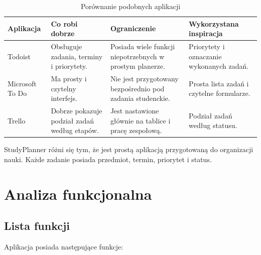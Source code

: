 \documentclass[12pt,a4paper]{article}
\begin{document}
\begin{table}[H]
\centering
\small
\begin{tabularx}{\textwidth}{|p{2.5cm}|X|X|X|}
\hline
\textbf{Aplikacja} &
\textbf{Co robi dobrze} &
\textbf{Ograniczenie} &
\textbf{Wykorzystana inspiracja} \\
\hline

Todoist &
Obsługuje zadania, terminy i priorytety. &
Posiada wiele funkcji niepotrzebnych w prostym planerze. &
Priorytety i oznaczanie wykonanych zadań. \\
\hline

Microsoft To Do &
Ma prosty i czytelny interfejs. &
Nie jest przygotowany bezpośrednio pod zadania studenckie. &
Prosta lista zadań i czytelne formularze. \\
\hline

Trello &
Dobrze pokazuje podział zadań według etapów. &
Jest nastawione głównie na tablice i pracę zespołową. &
Podział zadań według statusu. \\
\hline
\end{tabularx}
\caption{Porównanie podobnych aplikacji}
\end{table}

StudyPlanner różni się tym, że jest prostą aplikacją przygotowaną do organizacji nauki. Każde zadanie posiada przedmiot, termin, priorytet i status.

\section{Analiza funkcjonalna}

\subsection{Lista funkcji}

Aplikacja posiada następujące funkcje:
\end{document}
